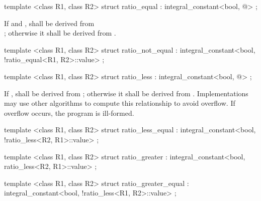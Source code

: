 \begin{itemdecl}
template <class R1, class R2> struct ratio_equal
  : integral_constant<bool, @\seebelow@> { };
\end{itemdecl}

\begin{itemdescr}
\pnum
If  and ,  shall be derived from\\ ; otherwise it shall
be derived from .
\end{itemdescr}

\begin{itemdecl}
template <class R1, class R2> struct ratio_not_equal
  : integral_constant<bool, !ratio_equal<R1, R2>::value> { };
\end{itemdecl}

\begin{itemdecl}
template <class R1, class R2> struct ratio_less
  : integral_constant<bool, @\seebelow@> { };
\end{itemdecl}

\begin{itemdescr}
\pnum
If ,  shall be
derived from ; otherwise it shall be derived from
. Implementations may use other algorithms to
compute this relationship to avoid overflow. If overflow occurs, the program is ill-formed.
\end{itemdescr}

\begin{itemdecl}
template <class R1, class R2> struct ratio_less_equal
  : integral_constant<bool, !ratio_less<R2, R1>::value> { };
\end{itemdecl}

\begin{itemdecl}
template <class R1, class R2> struct ratio_greater
  : integral_constant<bool, ratio_less<R2, R1>::value> { };
\end{itemdecl}

\begin{itemdecl}
template <class R1, class R2> struct ratio_greater_equal
  : integral_constant<bool, !ratio_less<R1, R2>::value> { };
\end{itemdecl}

